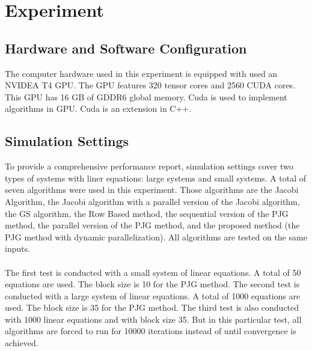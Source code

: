 \documentclass[11pt]{article}       %
\begin{document}
\section{Experiment} \label{expermient}

\subsection{Hardware and Software Configuration} \label{result}

The computer hardware used in this experiment is equipped with used an NVIDEA T4 GPU. The GPU features 320 tensor cores and 2560 CUDA cores. This GPU has 16 GB of GDDR6 global memory. Cuda is used to implement algorithms in GPU. Cuda is an extension in C++.

\subsection{Simulation Settings} \label{simulation_settings}

To provide a comprehensive performance report, simulation settings cover two types of systems with liner equations: large systems and small systems. A total of seven algorithms were used in this experiment. Those algorithms are the Jacobi Algorithm, the Jacobi algorithm with a parallel version of the Jacobi algorithm, the GS algorithm, the Row Based method, the sequential version of the PJG method, the parallel version of the PJG method, and the proposed method (the PJG method with dynamic parallelization). All algorithms are tested on the same inputs.
\\
\\
The first test is conducted with a small system of linear equations. A total of 50 equations are used. The block size is 10 for the PJG method. The second test is conducted with a large system of linear equations. A total of 1000 equations are used. The block size is 35 for the PJG method. The third test is also conducted with 1000 linear equations and with block size 35. But in this particular test, all algorithms are forced to run for 10000 iterations instead of until convergence is achieved.
\end{document}
